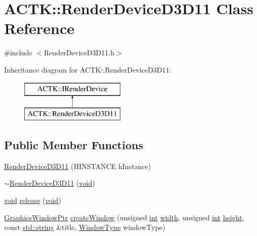 \hypertarget{class_a_c_t_k_1_1_render_device_d3_d11}{\section{A\-C\-T\-K\-:\-:Render\-Device\-D3\-D11 Class Reference}
\label{class_a_c_t_k_1_1_render_device_d3_d11}
}


{\ttfamily \#include $<$Render\-Device\-D3\-D11.\-h$>$}

Inheritance diagram for A\-C\-T\-K\-:\-:Render\-Device\-D3\-D11\-:\begin{figure}[H]
\begin{center}
\leavevmode
\includegraphics[height=2.000000cm]{class_a_c_t_k_1_1_render_device_d3_d11}
\end{center}
\end{figure}
\subsection*{Public Member Functions}
\begin{DoxyCompactItemize}
\item 
\hyperlink{class_a_c_t_k_1_1_render_device_d3_d11_a5fdaab94fadf74540a09df4f289e95b1}{Render\-Device\-D3\-D11} (H\-I\-N\-S\-T\-A\-N\-C\-E h\-Instance)
\item 
\hyperlink{class_a_c_t_k_1_1_render_device_d3_d11_a485ba27ba1d064184af5e0113d74c25b}{$\sim$\-Render\-Device\-D3\-D11} (\hyperlink{wglew_8h_aeea6e3dfae3acf232096f57d2d57f084}{void})
\item 
\hyperlink{wglew_8h_aeea6e3dfae3acf232096f57d2d57f084}{void} \hyperlink{class_a_c_t_k_1_1_render_device_d3_d11_a8e35650087b482b1dcabe48ed40f0d08}{release} (\hyperlink{wglew_8h_aeea6e3dfae3acf232096f57d2d57f084}{void})
\item 
\hyperlink{namespace_a_c_t_k_a73ab07fc6a568d003d19f3ed14ea7143}{Graphics\-Window\-Ptr} \hyperlink{class_a_c_t_k_1_1_render_device_d3_d11_ad0af669e61b5987ceaeb16f8fecfe805}{create\-Window} (unsigned \hyperlink{wglew_8h_a500a82aecba06f4550f6849b8099ca21}{int} \hyperlink{glew_8h_aa105b18f96e6bc2485cb7f576a7fb9ba}{width}, unsigned \hyperlink{wglew_8h_a500a82aecba06f4550f6849b8099ca21}{int} \hyperlink{glew_8h_aa214bd63e12f7ddf524c83894fcc69a7}{height}, const \hyperlink{glew_8h_ae9ea2d206f76ea82db7a2ea002fdef2f}{std\-::string} \&title, \hyperlink{namespace_a_c_t_k_a5cb71db6f350f73a1acaf41781bffb5b}{Window\-Type} window\-Type)
\end{DoxyCompactItemize}


